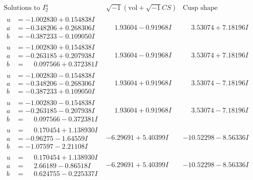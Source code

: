 \documentclass[1p]{elsarticle_modified}
\theoremstyle{definition}
\newcommand{\I}{\sqrt{-1}}
\begin{document}
$$\begin{array}{c|c|c}  
\text{Solutions to }I^u_{2}& \I (\text{vol} + \sqrt{-1}CS) & \text{Cusp shape}\\
 \hline 
\begin{aligned}
u &= -1.002830 + 0.154838 I \\
a &= -0.348206 + 0.268306 I \\
b &= -0.387233 - 0.109050 I\end{aligned}
 & \phantom{-}1.93604 - 0.91968 I & \phantom{-}3.53074 + 7.18196 I \\ \hline\begin{aligned}
u &= -1.002830 + 0.154838 I \\
a &= -0.263185 + 0.207938 I \\
b &= \phantom{-}0.097566 + 0.372381 I\end{aligned}
 & \phantom{-}1.93604 - 0.91968 I & \phantom{-}3.53074 + 7.18196 I \\ \hline\begin{aligned}
u &= -1.002830 - 0.154838 I \\
a &= -0.348206 - 0.268306 I \\
b &= -0.387233 + 0.109050 I\end{aligned}
 & \phantom{-}1.93604 + 0.91968 I & \phantom{-}3.53074 - 7.18196 I \\ \hline\begin{aligned}
u &= -1.002830 - 0.154838 I \\
a &= -0.263185 - 0.207938 I \\
b &= \phantom{-}0.097566 - 0.372381 I\end{aligned}
 & \phantom{-}1.93604 + 0.91968 I & \phantom{-}3.53074 - 7.18196 I \\ \hline\begin{aligned}
u &= \phantom{-}0.170454 + 1.138930 I \\
a &= -0.96275 - 1.64559 I \\
b &= -1.07597 - 2.21108 I\end{aligned}
 & -6.29691 + 5.40399 I & -10.52298 - 8.56336 I \\ \hline\begin{aligned}
u &= \phantom{-}0.170454 + 1.138930 I \\
a &= \phantom{-}2.66189 - 0.86518 I \\
b &= \phantom{-}0.624755 - 0.225337 I\end{aligned}
 & -6.29691 + 5.40399 I & -10.52298 - 8.56336 I \\ \hline\begin{aligned}

\end{aligned}
\end{array}$$
\end{document}
